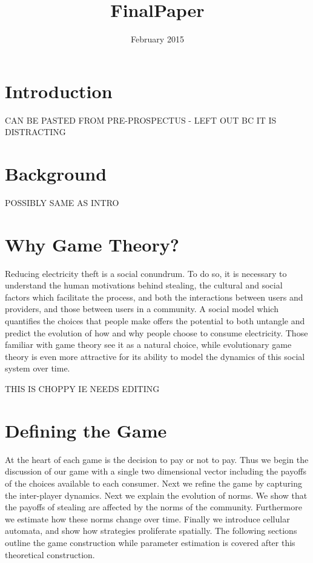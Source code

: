 \documentclass{article}
\title{FinalPaper}
\author{ }
\date{February 2015}
\begin{document}
\maketitle

\section{Introduction}
CAN BE PASTED FROM PRE-PROSPECTUS - LEFT OUT BC IT IS DISTRACTING


\section{Background}
POSSIBLY SAME AS INTRO

\section{Why Game Theory?}
Reducing electricity theft is a social conundrum. To do so, it is necessary to understand the human motivations behind stealing, the cultural and social factors which facilitate the process, and both the interactions between users and providers, and those between users in a community. A social model which quantifies the choices that people make offers the potential to both untangle and predict the evolution of how and why people choose to consume electricity. Those familiar with game theory see it as a natural choice, while evolutionary game theory is even more attractive for its ability to model the dynamics of this social system over time. 

                          
THIS IS CHOPPY IE NEEDS EDITING

\section{Defining the Game}
At the heart of each game is the decision to pay or not to pay. Thus we begin the discussion of our game with a single two dimensional vector including the payoffs of the choices available to each consumer. Next we refine the game by capturing the inter-player dynamics. Next we explain the evolution of norms. We show that the payoffs of stealing are affected by the norms of the community. Furthermore we estimate how these norms change over time. Finally we introduce cellular automata, and show how strategies proliferate spatially. The following sections outline the game construction while parameter estimation is covered after this theoretical construction. \\ 
\end{document}
